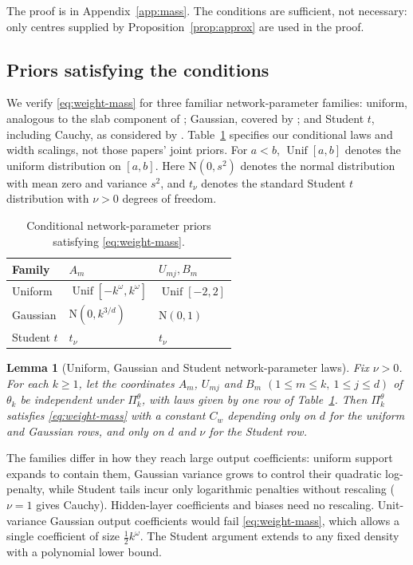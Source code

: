 \documentclass[11pt,a4paper]{article}
\newtheorem{lemma}{Lemma}
\theoremstyle{remark}
\DeclareMathOperator{\Unif}{Unif}
\begin{document}
The proof is in Appendix~\ref{app:mass}. The conditions are
sufficient, not necessary: only centres supplied by
Proposition~\ref{prop:approx} are used in the proof.

\subsection{Priors satisfying the conditions}\label{sec:examples}

We verify \eqref{eq:weight-mass} for three familiar network-parameter families:
uniform, analogous to the slab component of
\citet{polsonrockova2018}; Gaussian, covered by \citet{kongkim2025};
and Student $t$, including Cauchy, as considered by
\citet{castilloegels2025}. Table~\ref{tab:families} specifies our
conditional laws and width scalings, not those papers' joint priors.
For $a<b$, $\Unif[a,b]$ denotes the uniform distribution on $[a,b]$.
Here $\mathrm N(0,s^2)$ denotes the normal distribution with mean
zero and variance $s^2$, and $t_\nu$ denotes the standard Student $t$
distribution with $\nu>0$ degrees of freedom.

\begin{table}[htbp]
\caption{Conditional network-parameter priors satisfying \eqref{eq:weight-mass}.}
\label{tab:families}
\centering\small
\begin{tabular}{@{}lll@{}}
\toprule
Family & $A_m$ & $U_{mj},B_m$\\
\midrule
Uniform & $\Unif[-k^\omega,k^\omega]$ & $\Unif[-2,2]$\\
Gaussian & $\mathrm N(0,k^{3/d})$ & $\mathrm N(0,1)$\\
Student $t$ & $t_\nu$ & $t_\nu$\\
\bottomrule
\end{tabular}
\end{table}

\begin{lemma}[Uniform, Gaussian and Student network-parameter laws]
\label{lem:families}
Fix $\nu>0$. For each $k\geq1$, let the coordinates $A_m$, $U_{mj}$
and $B_m$ $(1\leq m\leq k,\ 1\leq j\leq d)$ of $\theta_k$ be
independent under $\Pi_k^\theta$, with laws given by one row of
Table~\ref{tab:families}. Then $\Pi_k^\theta$ satisfies
\eqref{eq:weight-mass} with a constant $C_w$ depending only on $d$
for the uniform and Gaussian rows, and only on $d$ and $\nu$ for the
Student row.
\end{lemma}

The families differ in how they reach large output coefficients:
uniform support expands to contain them, Gaussian variance grows to
control their quadratic log-penalty, while Student tails incur only
logarithmic penalties without rescaling ($\nu=1$ gives Cauchy).
Hidden-layer coefficients and biases need no rescaling. Unit-variance Gaussian
output coefficients would fail \eqref{eq:weight-mass}, which allows a
single coefficient of size $\tfrac12k^\omega$.
The Student argument extends to any fixed density with a polynomial
lower bound.
\end{document}
